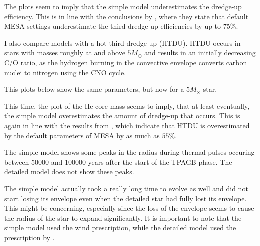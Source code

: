 \documentclass[a4paper,10pt]{article}
\begin{document}
    The plots seem to imply that the simple model underestimates the dredge-up efficiency. This is in line with the conclusions by \citet{rees2024b}, where they state that default MESA settings underestimate the third dredge-up efficiencies by up to 75\%.

    I also compare models with a hot third dredge-up (HTDU). HTDU occurs in stars with masses roughly at and above \(5M_\odot \) and results in an initially decreasing C/O ratio, as the hydrogen burning in the convective envelope converts carbon nuclei to nitrogen using the CNO cycle.

    This plots below show the same parameters, but now for a \(5M_\odot \) star.

    \begin{figure}[ht]
    \end{figure}

    This time, the plot of the He-core mass seems to imply, that at least eventually, the simple model overestimates the amount of dredge-up that occurs. This is again in line with the results from \citet{rees2024b}, which indicate that HTDU is overestimated by the default parameters of MESA by as much as \(55\%\).

    The simple model shows some peaks in the radius during thermal pulses occuring between 50000 and 100000 years after the start of the TPAGB phase. The detailed model does not show these peaks.

    The simple model actually took a really long time to evolve as well and did not start losing its envelope even when the detailed star had fully lost its envelope.
    This might be concerning, especially since the loss of the envelope seems to cause the radius of the star to expand significantly.
    It is important to note that the simple model used the \citet{vassiliadis1993} wind prescription, while the detailed model used the prescription by \citet{trabucchi2018}.
\end{document}
